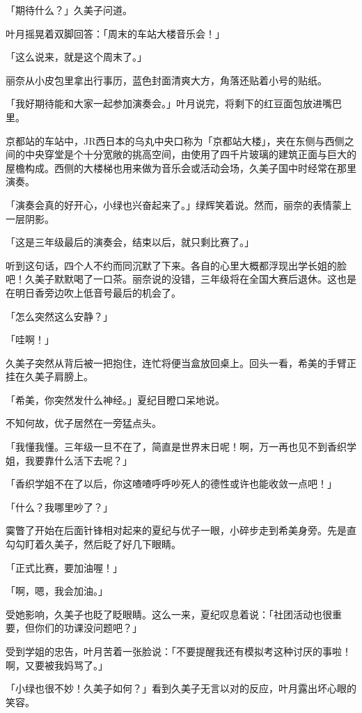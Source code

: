 \documentclass[UTF8]{ctexart}
\begin{document}
    「期待什么？」久美子问道。 

    叶月摇晃着双脚回答：「周末的车站大楼音乐会！」 

    「这么说来，就是这个周末了。」 

    丽奈从小皮包里拿出行事历，蓝色封面清爽大方，角落还贴着小号的贴纸。 

    「我好期待能和大家一起参加演奏会。」叶月说完，将剩下的红豆面包放进嘴巴里。 

    京都站的车站中，JR西日本的乌丸中央口称为「京都站大楼」，夹在东侧与西侧之间的中央穿堂是个十分宽敞的挑高空间，由使用了四千片玻璃的建筑正面与巨大的屋檐构成。西侧的大楼梯也用来做为音乐会或活动会场，久美子国中时经常在那里演奏。 

    「演奏会真的好开心，小绿也兴奋起来了。」绿辉笑着说。然而，丽奈的表情蒙上一层阴影。 

    「这是三年级最后的演奏会，结束以后，就只剩比赛了。」 

    听到这句话，四个人不约而同沉默了下来。各自的心里大概都浮现出学长姐的脸吧！久美子默默喝了一口茶。丽奈说的没错，三年级将在全国大赛后退休。这也是在明日香旁边吹上低音号最后的机会了。 

    「怎么突然这么安静？」 

    「哇啊！」 

    久美子突然从背后被一把抱住，连忙将便当盒放回桌上。回头一看，希美的手臂正挂在久美子肩膀上。 

    「希美，你突然发什么神经。」夏纪目瞪口呆地说。 

    不知何故，优子居然在一旁猛点头。 

    「我懂我懂。三年级一旦不在了，简直是世界末日呢！啊，万一再也见不到香织学姐，我要靠什么活下去呢？」 

    「香织学姐不在了以后，你这喳喳呼呼吵死人的德性或许也能收敛一点吧！」 

    「什么？我哪里吵了？」 

    霙瞥了开始在后面针锋相对起来的夏纪与优子一眼，小碎步走到希美身旁。先是直勾勾盯着久美子，然后眨了好几下眼睛。 

    「正式比赛，要加油喔！」 

    「啊，嗯，我会加油。」 

    受她影响，久美子也眨了眨眼睛。这么一来，夏纪叹息着说：「社团活动也很重要，但你们的功课没问题吧？」 

    受到学姐的忠告，叶月苦着一张脸说：「不要提醒我还有模拟考这种讨厌的事啦！啊，又要被我妈骂了。」 

    「小绿也很不妙！久美子如何？」看到久美子无言以对的反应，叶月露出坏心眼的笑容。 
\end{document}
